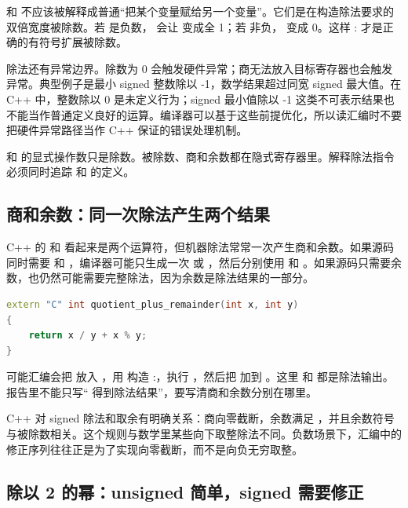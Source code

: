  和  不应该被解释成普通“把某个变量赋给另一个变量”。它们是在构造除法要求的双倍宽度被除数。若  是负数， 会让  变成全 1；若  非负， 变成 0。这样 : 才是正确的有符号扩展被除数。

除法还有异常边界。除数为 0 会触发硬件异常；商无法放入目标寄存器也会触发异常。典型例子是最小 signed 整数除以 -1，数学结果超过同宽 signed 最大值。在 C++ 中，整数除以 0 是未定义行为；signed 最小值除以 -1 这类不可表示结果也不能当作普通定义良好的运算。编译器可以基于这些前提优化，所以读汇编时不要把硬件异常路径当作 C++ 保证的错误处理机制。

\begin{warningbox}
 和  的显式操作数只是除数。被除数、商和余数都在隐式寄存器里。解释除法指令必须同时追踪  和  的定义。
\end{warningbox}

\subsection{商和余数：同一次除法产生两个结果}

C++ 的 \code{/} 和 \code{\%} 看起来是两个运算符，但机器除法常常一次产生商和余数。如果源码同时需要  和 ，编译器可能只生成一次  或 ，然后分别使用  和 。如果源码只需要余数，也仍然可能需要完整除法，因为余数是除法结果的一部分。

\begin{lstlisting}[language=C++]
extern "C" int quotient_plus_remainder(int x, int y)
{
    return x / y + x % y;
}
\end{lstlisting}

可能汇编会把  放入 ，用  构造 :，执行 ，然后把  加到 。这里  和  都是除法输出。报告里不能只写“ 得到除法结果”，要写清商和余数分别在哪里。

C++ 对 signed 除法和取余有明确关系：商向零截断，余数满足 ，并且余数符号与被除数相关。这个规则与数学里某些向下取整除法不同。负数场景下，汇编中的修正序列往往正是为了实现向零截断，而不是向负无穷取整。

\subsection{除以 2 的幂：unsigned 简单，signed 需要修正}

